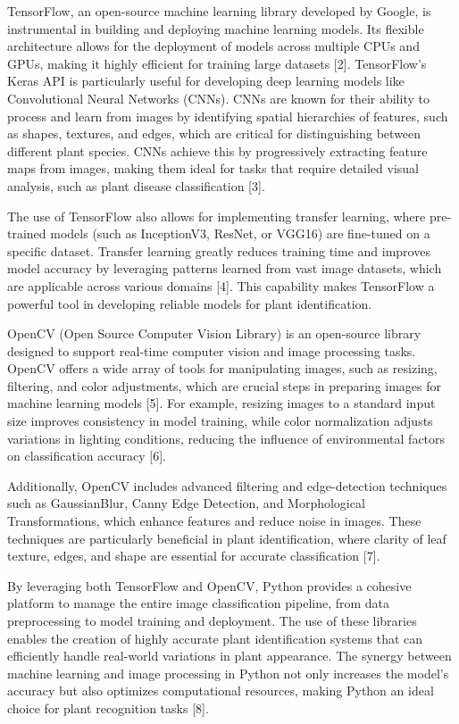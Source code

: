 \begin{multicols}{2}
TensorFlow, an open-source machine learning library developed by Google,
is instrumental in building and deploying machine learning models. Its
flexible architecture allows for the deployment of models across
multiple CPUs and GPUs, making it highly efficient for training large
datasets {[}2{]}. TensorFlow's Keras API is particularly useful for
developing deep learning models like Convolutional Neural Networks
(CNNs). CNNs are known for their ability to process and learn from
images by identifying spatial hierarchies of features, such as shapes,
textures, and edges, which are critical for distinguishing between
different plant species. CNNs achieve this by progressively extracting
feature maps from images, making them ideal for tasks that require
detailed visual analysis, such as plant disease classification {[}3{]}.

The use of TensorFlow also allows for implementing transfer learning,
where pre-trained models (such as InceptionV3, ResNet, or VGG16) are
fine-tuned on a specific dataset. Transfer learning greatly reduces
training time and improves model accuracy by leveraging patterns learned
from vast image datasets, which are applicable across various domains
{[}4{]}. This capability makes TensorFlow a powerful tool in developing
reliable models for plant identification.

OpenCV (Open Source Computer Vision Library) is an open-source library
designed to support real-time computer vision and image processing
tasks. OpenCV offers a wide array of tools for manipulating images, such
as resizing, filtering, and color adjustments, which are crucial steps
in preparing images for machine learning models {[}5{]}. For example,
resizing images to a standard input size improves consistency in model
training, while color normalization adjusts variations in lighting
conditions, reducing the influence of environmental factors on
classification accuracy {[}6{]}.

Additionally, OpenCV includes advanced filtering and edge-detection
techniques such as GaussianBlur, Canny Edge Detection, and Morphological
Transformations, which enhance features and reduce noise in images.
These techniques are particularly beneficial in plant identification,
where clarity of leaf texture, edges, and shape are essential for
accurate classification {[}7{]}.

By leveraging both TensorFlow and OpenCV, Python provides a cohesive
platform to manage the entire image classification pipeline, from data
preprocessing to model training and deployment. The use of these
libraries enables the creation of highly accurate plant identification
systems that can efficiently handle real-world variations in plant
appearance. The synergy between machine learning and image processing in
Python not only increases the model's accuracy but also optimizes
computational resources, making Python an ideal choice for plant
recognition tasks {[}8{]}.


\end{multicols}
